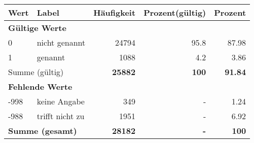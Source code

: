      \begin{longtable}{lXrrr}
     \toprule
     \textbf{Wert} & \textbf{Label} & \textbf{Häufigkeit} & \textbf{Prozent(gültig)} & \textbf{Prozent} \\
     \endhead
     \midrule
     \multicolumn{5}{l}{\textbf{Gültige Werte}}\\

     0 &
     \multicolumn{1}{X}{ nicht genannt   } &


       \num{24794} &
       \num[round-mode=places,round-precision=2]{95,8} &
         \num[round-mode=places,round-precision=2]{87,98} \\

     1 &
     \multicolumn{1}{X}{ genannt   } &


       \num{1088} &
       \num[round-mode=places,round-precision=2]{4,2} &
         \num[round-mode=places,round-precision=2]{3,86} \\
     \midrule
     \multicolumn{2}{l}{Summe (gültig)} &
       \textbf{\num{25882}} &
     \textbf{100} &
       \textbf{\num[round-mode=places,round-precision=2]{91,84}} \\
     \multicolumn{5}{l}{\textbf{Fehlende Werte}}\\
       -998 &
       keine Angabe &
         \num{349} &
        - &
         \num[round-mode=places,round-precision=2]{1,24} \\
       -988 &
       trifft nicht zu &
         \num{1951} &
        - &
         \num[round-mode=places,round-precision=2]{6,92} \\
     \midrule
     \multicolumn{2}{l}{\textbf{Summe (gesamt)}} &
          \textbf{\num{28182}} &
        \textbf{-} &
        \textbf{100} \\
     \bottomrule
     \end{longtable}
     

